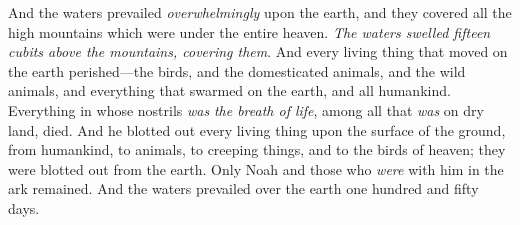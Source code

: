 \begin{biblechapter}
\verse And the waters prevailed \textit{overwhelmingly} upon the earth, and they covered all the high mountains which were under the entire heaven.
\verse \textit{The waters swelled fifteen cubits above the mountains, covering them}.
\verse And every living thing that moved on the earth perished—the birds, and the domesticated animals, and the wild animals, and everything that swarmed on the earth, and all humankind.
\verse Everything in whose nostrils \textit{was} \textit{the breath of life}, among all that \textit{was} on dry land, died.
\verse And he blotted out every living thing upon the surface of the ground, from humankind, to animals, to creeping things, and to the birds of heaven; they were blotted out from the earth. Only Noah and those who \textit{were} with him in the ark remained.
\verse And the waters prevailed over the earth one hundred and fifty days.
\end{biblechapter}

